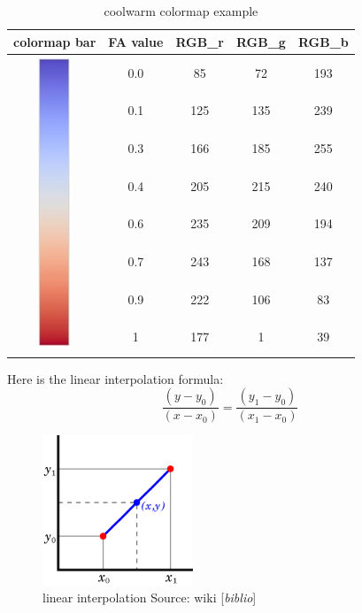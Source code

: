 \documentclass[hyperref, plainreport, noproblem]{cgvpub1}
\newcommand{\comment}[1]{{\color{red}[\textit{#1}]}}
\begin{document}
\begin{table}[h]
\caption{coolwarm colormap example}
\centering
\begin{tabular}{|c|c|c|c|c|}
\hline
colormap bar     & FA value & RGB\_r & RGB\_g & RGB\_b   \\ \hline
\multirow{8}{*}{\includegraphics{coolwarm_bar} } & 0.0      & 85     & 72     & 193      \\ [5pt] \cline{2-5}
	& 0.1      & 125    & 135    & 239      \\ [6pt] \cline{2-5}
	& 0.3      & 166    & 185    & 255      \\ [6pt] \cline{2-5}
	& 0.4      & 205    & 215    & 240      \\ [6pt] \cline{2-5}
	& 0.6      & 235    & 209    & 194      \\ [6pt] \cline{2-5}
	& 0.7      & 243    & 168    & 137      \\ [6pt] \cline{2-5}
	& 0.9      & 222    & 106    & 83       \\ [6pt] \cline{2-5}
	& 1        & 177    & 1      & 39      \\ [6pt] \hline
\end{tabular}
\label{tbl:coolwarm}
\end{table}

Here is the linear interpolation formula:
\begin{equation}
 \frac{(y-y_0)}{(x-x_0)} = \frac{(y_1-y_0)}{(x_1-x_0)}
\end{equation}

\begin{figure}[h]
	\centering
	\includegraphics[width=0.4\textwidth]{interp}
	\caption{ linear interpolation 
Source: wiki \comment{biblio}}
	\label{fig:interp}
\end{figure}
\end{document}
